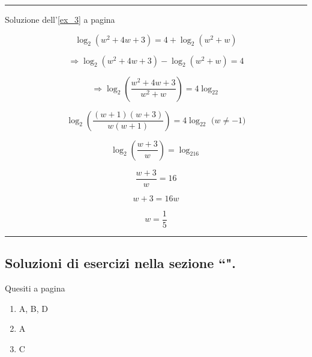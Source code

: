 \vspace{1cm}
\hrule
\vspace{1cm}
Soluzione dell'\ref{ex_3} a pagina \pageref{ex_3}\label{sol_3}

\begin{equation*}
\log_2(w^2+4w+3)=4+\log_2(w^2+w)
\end{equation*}

\begin{equation*}
\Rightarrow\log_2(w^2+4w+3)-\log_2(w^2+w)=4
\end{equation*}

\begin{equation*}
\Rightarrow
\log_2\left(\frac{
w^2+4w+3
}{
w^2+w
}\right) = 4\log_22
\end{equation*}

\begin{equation*}
\log_2\left(\frac{
(w+1)(w+3)
}{
w(w+1)
}\right) = 4\log_22 \textrm{ ($w\neq -1$)}
\end{equation*}

\begin{equation*}
\log_2\left(\frac{w+3}{w}\right) = \log_216
\end{equation*}

\begin{equation*}
\frac{w+3}{w}=16
\end{equation*}

\begin{equation*}
w+3=16w
\end{equation*}

\begin{equation*}
w=\frac{1}{5}
\end{equation*}

\vspace{1cm}
\hrule
\vspace{1cm}


\subsection{Soluzioni di esercizi nella sezione ``\textbf{}".}

Quesiti a pagina \pageref{ex_mc}
\label{sol_mc}

\begin{enumerate}
\item A, B, D
\item A
\item C
\end{enumerate}

